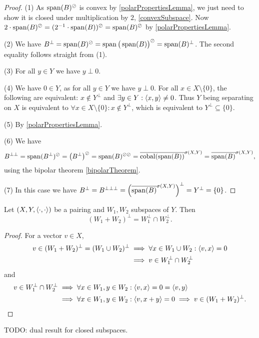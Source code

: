\begin{proof}
(1) As $\operatorname{span}(B)^\oslash$ is convex by \ref{polarPropertiesLemma}, we just need to show it is closed under multiplication by $2$, \ref{convexSubspace}. Now $2\cdot \operatorname{span}(B)^\oslash = (2^{-1}\cdot\operatorname{span}(B))^\oslash = \operatorname{span}(B)^\oslash$ by \ref{polarPropertiesLemma}.

(2) We have $B^\perp = \operatorname{span}(B)^\oslash = \operatorname{span}\big(\operatorname{span}(B)\big)^\oslash = \operatorname{span}(B)^\perp$. The second equality follows straight from (1).

(3) For all $y\in Y$ we have $y\perp 0$.

(4) We have $0\in Y$, as for all $y\in Y$ we have $y\perp 0$. For all $x\in X\setminus\{0\}$, the following are equivalent: $x\notin Y^\perp$ and $\exists y\in Y: \left\langle x,y \right\rangle\neq 0$. Thus $Y$ being separating on $X$ is equivalent to $\forall x\in X\setminus \{0\}: x\notin Y^\perp$, which is equivalent to $Y^\perp \subseteq \{0\}$.

(5) By \ref{polarPropertiesLemma}.

(6) We have 
\[ B^{\perp\perp} = \operatorname{span}(B^\perp)^\oslash = \big(B^\perp\big)^\oslash = \operatorname{span}(B)^{\oslash\oslash} = \overline{\operatorname{cobal}(\operatorname{span}(B))}^{\sigma(X,Y)} = \overline{\operatorname{span}(B)}^{\sigma(X,Y)}, \]
using the bipolar theorem \ref{bipolarTheorem}.

(7) In this case we have $B^\perp = B^{\perp\perp\perp} = \left(\overline{\operatorname{span}(B)}^{\sigma(X,Y)}\right)^\perp = Y^\perp = \{0\}$.
\end{proof}


\begin{proposition}
Let $\sSet{X,Y,\pair{\cdot,\cdot}}$ be a pairing and $W_1,W_2$ subspaces of $Y$. Then
\[ (W_1+W_2)^\perp = W_1^\perp \cap W_2^\perp. \]
\end{proposition}
\begin{proof}
For a vector $v\in X$,
\begin{align*}
v\in (W_1+W_2)^\perp = (W_1 \cup W_2)^\perp &\implies \forall x\in W_1\cup W_2: \inner{v,x} = 0 \\
&\implies v\in W_1^\perp \cap W_2^\perp
\end{align*}
and
\begin{align*}
v\in W_1^\perp \cap W_2^\perp &\implies \forall x\in W_1, y\in W_2: \inner{v,x} = 0 = \inner{v,y} \\
&\implies \forall x\in W_1, y\in W_2:\inner{v, x+y} = 0 \implies v\in (W_1+W_2)^\perp.
\end{align*}
\end{proof}
TODO: dual result for closed subspaces.


